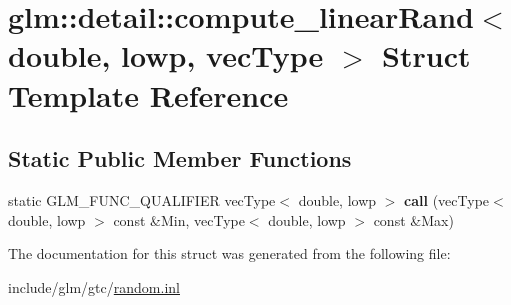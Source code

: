 \hypertarget{structglm_1_1detail_1_1compute__linearRand_3_01double_00_01lowp_00_01vecType_01_4}{}\section{glm\+:\+:detail\+:\+:compute\+\_\+linear\+Rand$<$ double, lowp, vec\+Type $>$ Struct Template Reference}
\label{structglm_1_1detail_1_1compute__linearRand_3_01double_00_01lowp_00_01vecType_01_4}
\subsection*{Static Public Member Functions}
\begin{DoxyCompactItemize}
\item 
\mbox{\label{structglm_1_1detail_1_1compute__linearRand_3_01double_00_01lowp_00_01vecType_01_4_a87f42da70174985a5b6c772a0b540818}} 
static G\+L\+M\+\_\+\+F\+U\+N\+C\+\_\+\+Q\+U\+A\+L\+I\+F\+I\+ER vec\+Type$<$ double, lowp $>$ {\bfseries call} (vec\+Type$<$ double, lowp $>$ const \&Min, vec\+Type$<$ double, lowp $>$ const \&Max)
\end{DoxyCompactItemize}


The documentation for this struct was generated from the following file\+:\begin{DoxyCompactItemize}
\item 
include/glm/gtc/\hyperlink{random_8inl}{random.\+inl}\end{DoxyCompactItemize}
